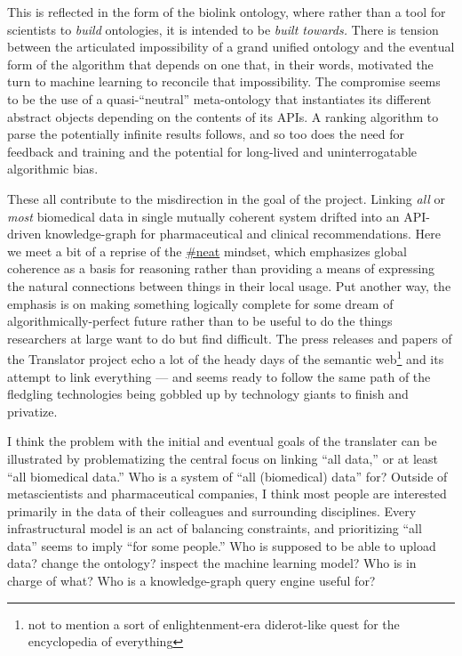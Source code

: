 \documentclass[10pt]{tufte-book}
\begin{document}
This is reflected in the form of the biolink ontology, where rather than
a tool for scientists to \emph{build} ontologies, it is intended to be
\emph{built towards.} There is tension between the articulated
impossibility of a grand unified ontology and the eventual form of the
algorithm that depends on one that, in their words, motivated the turn
to machine learning to reconcile that impossibility. The compromise
seems to be the use of a quasi-``neutral'' meta-ontology that
instantiates its different abstract objects depending on the contents of
its APIs. A ranking algorithm to parse the potentially infinite results
follows, and so too does the need for feedback and training and the
potential for long-lived and uninterrogatable algorithmic bias.

These all contribute to the misdirection in the goal of the project.
Linking \emph{all} or \emph{most} biomedical data in single mutually
coherent system drifted into an API-driven knowledge-graph for
pharmaceutical and clinical recommendations. Here we meet a bit of a
reprise of the \protect\hyperlink{neatness-vs-scruffiness}{\#neat}
mindset, which emphasizes global coherence as a basis for reasoning
rather than providing a means of expressing the natural connections
between things in their local usage. Put another way, the emphasis is on
making something logically complete for some dream of
algorithmically-perfect future rather than to be useful to do the things
researchers at large want to do but find difficult. The press releases
and papers of the Translator project echo a lot of the heady days of the
semantic web\footnote{not to mention a sort of enlightenment-era
  diderot-like quest for the encyclopedia of everything} and its attempt
to link everything --- and seems ready to follow the same path of the
fledgling technologies being gobbled up by technology giants to finish
and privatize.

I think the problem with the initial and eventual goals of the
translater can be illustrated by problematizing the central focus on
linking ``all data,'' or at least ``all biomedical data.'' Who is a
system of ``all (biomedical) data'' for? Outside of metascientists and
pharmaceutical companies, I think most people are interested primarily
in the data of their colleagues and surrounding disciplines. Every
infrastructural model is an act of balancing constraints, and
prioritizing ``all data'' seems to imply ``for some people.'' Who is
supposed to be able to upload data? change the ontology? inspect the
machine learning model? Who is in charge of what? Who is a
knowledge-graph query engine useful for?
\end{document}
